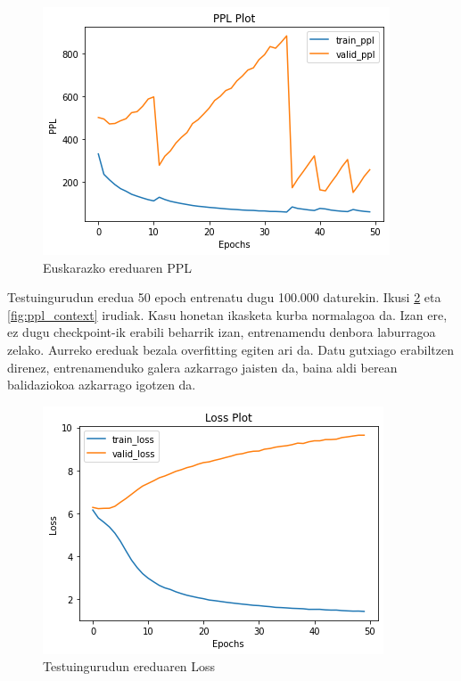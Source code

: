 \documentclass[11pt,a4paper]{article}
\begin{document}
\begin{figure}[ht]
    \centering
    \includegraphics[width=\linewidth]{ppl}
    \caption{Euskarazko ereduaren PPL}
    \label{fig:ppl}
\end{figure}

Testuingurudun eredua 50 epoch entrenatu dugu 100.000 daturekin. Ikusi \ref{fig:loss_context} eta \ref{fig:ppl_context} irudiak. Kasu honetan ikasketa kurba normalagoa da. Izan ere, ez dugu checkpoint-ik erabili beharrik izan, entrenamendu denbora laburragoa zelako. Aurreko ereduak bezala overfitting egiten ari da. Datu gutxiago erabiltzen direnez, entrenamenduko galera azkarrago jaisten da, baina aldi berean balidaziokoa azkarrago igotzen da.

\begin{figure}[ht]
    \centering
    \includegraphics[width=\linewidth]{loss_context}
    \caption{Testuingurudun ereduaren Loss}
    \label{fig:loss_context}
\end{figure}
\end{document}

